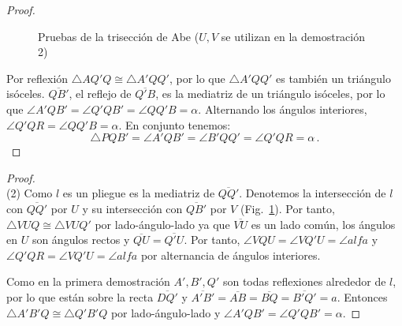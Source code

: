 \begin{proof}
\begin{figure}[ht]
\begin{center}
\end{center}
\caption{Pruebas de la trisección de Abe ($U,V$ se utilizan en la demostración 2)}\label{f.abe2}
\end{figure}

Por reflexión $\triangle AQ'Q\cong \triangle A'QQ'$, por lo que $\triangle A'QQ'$ es también un triángulo isóceles.
$\overline{QB'}$, el reflejo de $\overline{Q'B}$, es la mediatriz de un triángulo isóceles, por lo que $\angle A'QB'=\angle Q'QB'=\angle QQ'B=\alpha$.
Alternando los ángulos interiores, $\angle Q'QR=\angle QQ'B=\alpha$.
En conjunto tenemos:
\[
\triangle PQB'=\angle A'QB'=\angle B'QQ'=\angle Q'QR=\alpha\,.
\]
\end{proof}

\begin{proof}
\mbox{}\\
(2)
Como $l$ es un pliegue es la mediatriz de $\overline{QQ'}$. Denotemos la intersección de $l$ con $\overline{QQ'}$ por $U$ y su intersección con $\overline{QB'}$ por $V$ (Fig.~\ref{f.abe2}). Por tanto, $\triangle VUQ\cong \triangle VUQ'$ por lado-ángulo-lado ya que $\overline{VU}$ es un lado común, los ángulos en $U$ son ángulos rectos y $\overline{QU}=\overline{Q'U}$. Por tanto, $\angle VQU=\angle VQ'U=\angle alfa$ y $\angle Q'QR=\angle VQ'U=\angle alfa$ por alternancia de ángulos interiores.

Como en la primera demostración $A', B', Q'$ son todas reflexiones alrededor de $l$, por lo que están sobre la recta $\overline{DQ'}$ y $\overline{A'B'}=\overline{AB}=\overline{BQ}=\overline{B'Q'}=a$. Entonces $\triangle A'B'Q\cong\triangle Q'B'Q$ por lado-ángulo-lado y $\angle A'QB'=\angle Q'QB'=\alpha$.
\end{proof}

